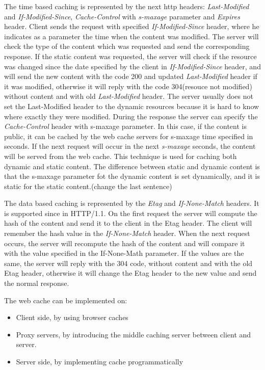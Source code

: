 The time based caching is represented by the next http headers: \textit{Last-Modified} and \textit{If-Modified-Since}, \textit{Cache-Control} with \textit{s-maxage} parameter and \textit{Expires} header. Client sends the request with specified \textit{If-Modified-Since} header, where he indicates as a parameter the time when the content was modified. The server will check the type of the content which was requested and send the corresponding response. If the static content was requested, the server will check if the resource was changed since the date specified by the client in \textit{If-Modified-Since} header, and will send the new content with the code 200 and updated \textit{Last-Modified} header if it was modified, otherwise it will reply with the code 304(resouce not modified) without content and with old \textit{Last-Modified} header. The server usually does not set the Last-Modified header to the dynamic resources because it is hard to know where exactly they were modified. 
During the response the server can specify the \textit{Cache-Control} header with s-maxage parameter. In this case, if the content is public, it can be cached by the web cache servers for s-maxage time specified in seconds. If the next request will occur in the next \textit{s-maxage} seconds, the content will be served from the web cache. This technique is used for caching both dynamic and static content. The difference between static and dynamic content is that the s-maxage parameter fot the dynamic content is set dynamically, and it is static for the static content.(change the last sentence)

The data based caching is represented by the \textit{Etag} and \textit{If-None-Match} headers. It is supported since in HTTP/1.1. On the first request the server will compute the hash of the content and send it to the client in the Etag header. The client will remember the hash value in the \textit{If-None-Match} header. When the next request occurs, the server will recompute the hash of the content and will compare it with the value specified in the If-None-Math parameter. If the values are the same, the server will reply with the 304 code, without content and with the old Etag header, otherwise it will change the Etag header to the new value and send the normal response. 


The web cache can be implemented on: 

\begin{itemize}
    \item Client side, by using browser caches
    \item Proxy servers, by introducing the middle caching server between client and server.
    \item Server side, by implementing cache programmatically
\end{itemize}


